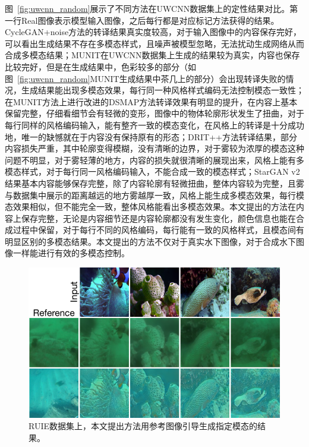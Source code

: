 图~\ref{fig:uwcnn_random}展示了不同方法在UWCNN数据集上的定性结果对比。第一行Real图像表示模型输入图像，之后每行都是对应标记方法获得的结果。CycleGAN+noise方法的转译结果真实度较高，对于输入图像中的内容保存完好，可以看出生成结果不存在多模态样式，且噪声被模型忽略，无法扰动生成网络从而合成多模态结果；MUNIT在UWCNN数据集上生成的结果较为真实，内容也保存比较完好，但是在生成结果中，色彩较多的部分（如图~\ref{fig:uwcnn_random}MUNIT生成结果中茶几上的部分）会出现转译失败的情况，生成结果能出现多模态效果，每行同一种风格样式编码无法控制模态一致性；在MUNIT方法上进行改进的DSMAP方法转译效果有明显的提升，在内容上基本保留完整，仔细看细节会有轻微的变形，图像中的物体轮廓形状发生了扭曲，对于每行同样的风格编码输入，能有整齐一致的模态变化，在风格上的转译是十分成功地，唯一的缺憾就在于内容没有保持原有的形态；DRIT++方法转译结果，部分内容损失严重，其中轮廓变得模糊，没有清晰的边界，对于雾较为浓厚的模态这种问题不明显，对于雾轻薄的地方，内容的损失就很清晰的展现出来，风格上能有多模态样式，对于每行同一风格编码输入，不能合成一致的模态样式；StarGAN v2结果基本内容能够保存完整，除了内容轮廓有轻微扭曲，整体内容较为完整，且雾与数据集中展示的距离越远的地方雾越厚一致，风格上能生成多模态效果，每行模态效果相似，但不能完全一致，整体风格能看出多模态效果。本文提出的方法在内容上保存完整，无论是内容细节还是内容轮廓都没有发生变化，颜色信息也能在合成过程中保留，对于每行不同的风格编码，每行能有一致的风格样式，且模态间有明显区别的多模态结果。本文提出的方法不仅对于真实水下图像，对于合成水下图像一样能进行有效的多模态控制。


\begin{figure}[ht]
    \centering
	\includegraphics[width=\textwidth]{figures/RUIE_guidance.pdf}
	\caption{RUIE数据集上，本文提出方法用参考图像引导生成指定模态的结果。}
	\label{fig:ruie_guide}
\end{figure}

